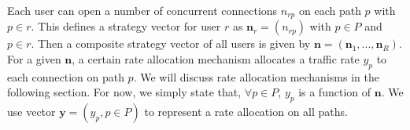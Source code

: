 \documentclass[conference]{IEEEtran}
\begin{document}
\begin{comment}
Links required by individual paths are captured by the path-link
incidence matrix $A$, defined by:
\begin{equation}
A_{jp}= \left \{
\begin{array}{ll}
1, & \textrm{if $j\in p$}\\
0, & \textrm{if $j\notin p$}
\end{array} \right.
\end{equation}
Furthermore, we can capture the relationship between paths and
users by the path-user incidence matrix $H$, defined by:
\begin{equation}
H_{rp}= \left \{
\begin{array}{ll}
1, & \textrm{if $p\in r$}\\
0, & \textrm{if $p\notin r$}
\end{array} \right.
\end{equation}
\end{comment}

Each user can open a number of concurrent connections $n_{rp}$ on
each path $p$ with $p\in r$. This defines a strategy vector for
user $r$ as $\mathbf{n}_r=(n_{rp})$ with $p\in P$ and $p\in r$.
Then a composite strategy vector of all users is given by
$\mathbf{n}=(\mathbf{n}_1, ..., \mathbf{n}_R)$.
For a given $\mathbf{n}$, a certain rate allocation mechanism
allocates a traffic rate $y_p$ to each connection on path $p$. We
will discuss rate allocation mechanisms in the following section.
For now, we simply state that, $\forall p\in P$, $y_p$ is a
function of $\mathbf{n}$. We use vector $\mathbf{y}=(y_p, p\in P)$
to represent a rate allocation on all paths.
\end{document}
